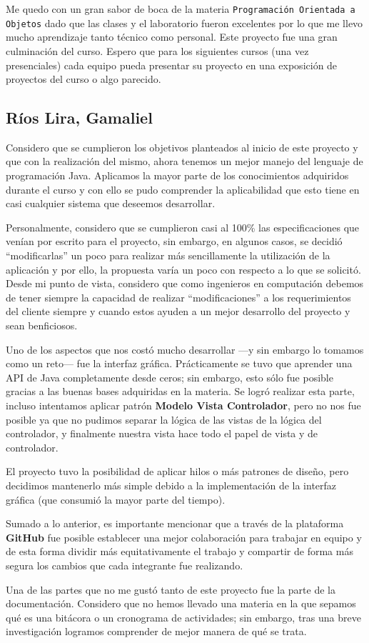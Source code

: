 Me quedo con un gran sabor de boca de la materia \texttt{Programación Orientada a Objetos} dado que las clases
y el laboratorio fueron excelentes por lo que me llevo mucho aprendizaje tanto técnico como personal. Este proyecto
fue una gran culminación del curso. Espero que para los siguientes cursos (una vez presenciales) cada equipo
pueda presentar su proyecto en una exposición de proyectos del curso o algo parecido.

\newpage

\subsection*{Ríos Lira, Gamaliel}
Considero que se cumplieron los objetivos planteados al inicio de este proyecto y que con la realización del 
mismo, ahora tenemos un mejor manejo del lenguaje de programación Java. Aplicamos la mayor parte de los conocimientos 
adquiridos durante el curso y con ello se pudo comprender la aplicabilidad que esto tiene en casi cualquier sistema 
que deseemos desarrollar.

Personalmente, considero que se cumplieron casi al 100\% las especificaciones que venían por escrito para el proyecto, 
sin embargo, en algunos casos, se decidió ``modificarlas'' un poco para realizar más sencillamente la utilización de la 
aplicación y por ello, la propuesta varía un poco con respecto a lo que se solicitó. Desde mi punto de vista, considero 
que como ingenieros en computación debemos de tener siempre la capacidad de realizar ``modificaciones'' a los 
requerimientos del cliente siempre y cuando estos ayuden a un mejor desarrollo del proyecto y sean benficiosos.

Uno de los aspectos que nos costó mucho desarrollar ---y sin embargo lo tomamos como un reto--- fue la interfaz gráfica. 
Prácticamente se tuvo que aprender una API de Java completamente desde ceros; sin embargo, esto sólo fue posible gracias 
a las buenas bases adquiridas en la materia. Se logró realizar esta parte, incluso intentamos aplicar patrón \textbf{Modelo 
Vista Controlador}, pero no nos fue posible ya que no pudimos separar la lógica de las vistas de la lógica del controlador, 
y finalmente nuestra vista hace todo el papel de vista y de controlador.

El proyecto tuvo la posibilidad de aplicar hilos o más patrones de diseño, pero decidimos mantenerlo más simple debido a la 
implementación de la interfaz gráfica (que consumió la mayor parte del tiempo).

Sumado a lo anterior, es importante mencionar que a través de la plataforma \textbf{GitHub} fue posible establecer una mejor 
colaboración para trabajar en equipo y de esta forma dividir más equitativamente el trabajo y compartir de forma más segura 
los cambios que cada integrante fue realizando.

Una de las partes que no me gustó tanto de este proyecto fue la parte de la documentación. Considero que no hemos llevado 
una materia en la que sepamos qué es una bitácora o un cronograma de actividades; sin embargo, tras una breve investigación 
logramos comprender de mejor manera de qué se trata.